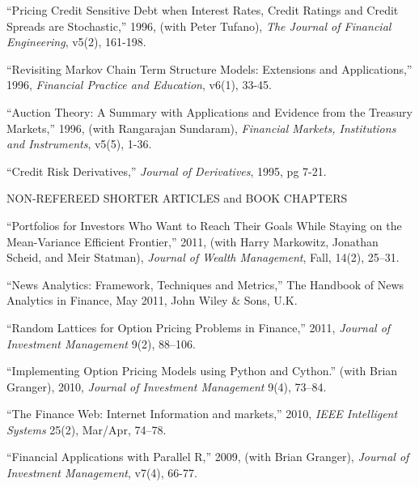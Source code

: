 \documentclass{article}
\begin{document}
\begin{etaremune}
\item
``Pricing Credit Sensitive Debt when Interest Rates, Credit Ratings
and Credit Spreads are Stochastic,'' 1996, 
(with Peter Tufano), {\it The Journal of Financial Engineering},
v5(2), 161-198.

\item
``Revisiting Markov Chain Term Structure Models: Extensions and
Applications,'' 1996, {\it Financial Practice and Education}, v6(1), 33-45.  

\item
``Auction Theory: A Summary with Applications and Evidence
from the Treasury Markets,'' 1996, (with Rangarajan Sundaram),
{\it Financial Markets, Institutions and Instruments}, v5(5), 1-36.

\item
``Credit Risk Derivatives,'' {\it Journal of Derivatives}, 1995, pg 7-21. 



\begin{description}
\item[NON-REFEREED SHORTER ARTICLES and BOOK CHAPTERS] \mbox{}
\end{description}


\item ``Portfolios for Investors Who Want to Reach Their Goals While Staying on the Mean-Variance Efficient Frontier,'' 2011, (with Harry Markowitz, Jonathan Scheid, and Meir Statman), {\it Journal of Wealth Management}, Fall, 14(2), 25--31.

\item ``News Analytics: Framework, Techniques and Metrics,'' The Handbook of News Analytics in Finance, May 2011, John Wiley \& Sons, U.K. 

\item ``Random Lattices for Option Pricing Problems in Finance,'' 2011, {\it Journal of Investment Management} 9(2), 88--106. 

\item ``Implementing Option Pricing Models using Python and Cython.''
(with Brian Granger), 2010, {\it Journal of Investment Management} 9(4), 73--84. 


\item ``The Finance Web: Internet Information and markets,'' 2010, {\it IEEE Intelligent Systems} 25(2), Mar/Apr, 74--78. 

\item ``Financial Applications with Parallel R,'' 2009, (with Brian Granger), {\it Journal of Investment Management}, v7(4), 66-77. 	


\end{etaremune}
\end{document}

